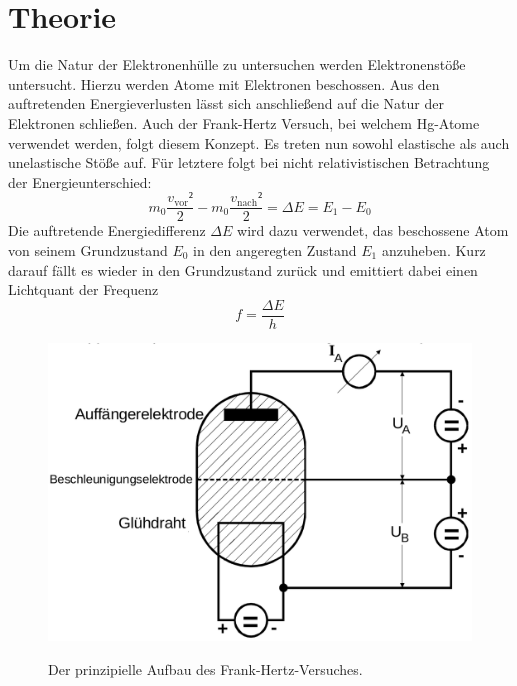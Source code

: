 
\section{Theorie}
\label{sec:Theorie}
Um die Natur der Elektronenhülle zu untersuchen werden Elektronenstöße untersucht.
Hierzu werden Atome mit Elektronen beschossen. Aus den auftretenden Energieverlusten
lässt sich anschließend auf die Natur der Elektronen schließen. Auch der Frank-Hertz
Versuch, bei welchem Hg-Atome verwendet werden,
folgt diesem Konzept. Es treten nun sowohl elastische als auch unelastische Stöße auf.
Für letztere folgt bei nicht relativistischen Betrachtung der Energieunterschied:
\begin{equation}
  m_0 \frac{v_\text{vor}²}{2} - m_0 \frac{v_\text{nach}²}{2} = \Delta E = E_1 - E_0\label{eq:Estoss}
  \end{equation}
Die auftretende Energiedifferenz $\Delta E$ wird dazu verwendet, das beschossene
Atom von seinem Grundzustand $E_0$ in den angeregten Zustand $E_1$ anzuheben. Kurz
darauf fällt es wieder in den Grundzustand zurück und emittiert dabei einen Lichtquant der Frequenz
\begin{equation}
  f = \frac{\Delta E}{h} \label{eq:f}
  \end{equation}

  \begin{figure}
 \centering
 \caption{Der prinzipielle Aufbau des Frank-Hertz-Versuches.}
 \includegraphics[width=\linewidth-170pt,height=\textheight-170pt,keepaspectratio]{content/franktheorie.png}
 \label{fig:franktheorie}
\end{figure}

